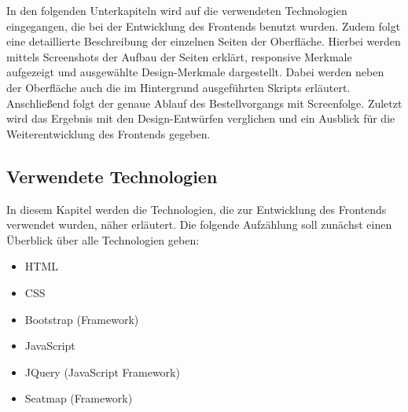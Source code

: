 	    In den folgenden Unterkapiteln wird auf die verwendeten Technologien eingegangen, die bei der Entwicklung des Frontends benutzt wurden. Zudem folgt eine detaillierte Beschreibung der einzelnen Seiten der Oberfläche. Hierbei werden mittels Screenshots der Aufbau der Seiten erklärt, responsive Merkmale aufgezeigt und ausgewählte Design-Merkmale dargestellt. Dabei werden neben der Oberfläche auch die im Hintergrund ausgeführten Skripts erläutert. Anschließend folgt der genaue Ablauf des Bestellvorgangs mit Screenfolge. Zuletzt wird das Ergebnis mit den Design-Entwürfen verglichen und ein Ausblick für die Weiterentwicklung des Frontends gegeben.
	    
	    \subsection{Verwendete Technologien}
	    In diesem Kapitel werden die Technologien, die zur Entwicklung des Frontends verwendet wurden, näher erläutert. Die folgende Aufzählung soll zunächst einen Überblick über alle Technologien geben:
	    \begin{singlespacing}
	    \begin{itemize}
	        \setlength\itemsep{-0.8em}
	        \item HTML
	        \item \acs{CSS}
	        \item Bootstrap (Framework)
	        \item JavaScript
	        \item JQuery (JavaScript Framework)
	        \item Seatmap (Framework)
	    \end{itemize}
	     \end{singlespacing}
	    
